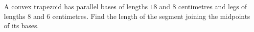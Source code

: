 A convex trapezoid has parallel bases of lengths $18$ and $8$ centimetres and legs of lengths $8$ and $6$ centimetres. Find the length of the segment joining the midpoints of its bases.
